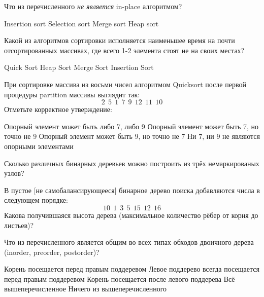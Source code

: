 \documentclass[12pt]{exam}
\begin{document}
\begin{questions}
\begin{checkboxes}
\end{checkboxes}

\question[1] Что из перечисленного {\em не является} in-place алгоритмом?
\begin{checkboxes}
\choice Insertion sort
\choice Selection sort
\CorrectChoice Merge sort
\choice Heap sort
\end{checkboxes}

\question[1] Какой из алгоритмов сортировки исполняется наименьшее время на почти отсортированных массивах, где всего 1-2 элемента стоят не на своих местах? 
\begin{checkboxes}
\choice Quick Sort
\choice Heap Sort
\choice Merge Sort
\CorrectChoice Insertion Sort
\end{checkboxes}

\question[1] При сортировке массива из восьми чисел алгоритмом Quicksort после первой процедуры partition массивы выглядит так:
$$
2~~5~~1~~7~~9~~12~~11~~10
$$
Отметьте корректное утверждение:
\begin{checkboxes}
\CorrectChoice Опорный элемент может быть либо 7, либо 9
\choice Опорный элемент может быть 7, но точно не 9
\choice Опорный элемент может быть 9, но точно не 7
\choice Ни 7, ни 9 не являются опорными элементами
\end{checkboxes}

\question[1] Сколько различных бинарных деревьев можно построить из трёх немаркированых узлов?
\begin{checkboxes}
\end{checkboxes}

\question[1] В пустое [не самобалансирующееся] бинарное дерево поиска добавляются числа в следующем порядке:
$$
10~~1~~3~~5~~15~~12~~16
$$
Какова получившаяся высота дерева (максимальное количество рёбер от корня до листьев)?
\begin{checkboxes}
\end{checkboxes}

\question[1] Что из перечисленного является общим во всех типах обходов двоичного дерева (inorder, preorder, postorder)?
\begin{checkboxes}
\choice Корень посещается перед правым поддеревом
\CorrectChoice Левое поддерево всегда посещается перед правым поддеревом
\choice Корень посещается после левого поддерева
\choice Всё вышеперечисленное
\choice Ничего из вышеперечисленного
\end{checkboxes}


\end{questions}
\end{document}
